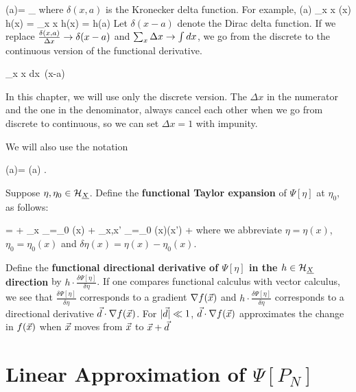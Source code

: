 \beq
\frac{\delta \Psi[\eta]}
{\delta \eta(a)}=
\lim_{\eps{}}
{\eps}
\eeq
where $\delta(x,a)$ is the Kronecker delta function.
For example,
\beq
\frac{\delta}
{\delta \eta(a)}
\sum_x \Delta x\; \eta(x) h(x)
=
\sum_x \Delta x  h(x)
=
h(a)
\eeq
 Let
$\delta(x-a)$ denote the Dirac delta function. If we replace
$\frac{\delta(x,a)}{\Delta x}\rightarrow\delta(x-a)$
and $\sum_x \Delta x\rightarrow \int dx$, we go
from the discrete to the continuous version
of the functional derivative.

\beq
\sum_x \Delta x 
\rarrow \int dx\, \delta(x-a)
\eeq

In this chapter, we will use only the discrete version.
The $\Delta x$ in the numerator
and the one in the denominator, always cancel
each other when we go from discrete
to continuous, so we can
set
$\Delta x=1$ with impunity.



We will also use the notation

\beq
\dpsi[\eta](a)=
\frac{\delta \Psi[\eta]}
{\delta \eta(a)}
\;.
\eeq

Suppose $\eta, \eta_0\in \calh_\rvX$. Define the
{\bf functional Taylor expansion} of $\Psi[\eta]$
at $\eta_0$, as follows:

\beq
\Psi[\eta]=
\Psi[\eta_0]
+ \sum_x
_{\eta=\eta_0}
\delta\eta(x)
+
\sum_{x,x'}
_{\eta=\eta_0}
\delta\eta(x)\delta\eta(x')
+
\cdots
\eeq
where we abbreviate
$ \eta =\eta(x)$,
$\eta_0=\eta_0(x)$ and $\delta \eta(x) = \eta(x)-\eta_0(x)$.



Define the
{\bf functional directional derivative of $\Psi[\eta]$ in
the $h\in \calh_\rvX$
direction}
by $h\cdot\frac{\delta \Psi[\eta]}{\delta \eta}$.
If one compares functional calculus with vector calculus, we see that
$\frac{\delta \Psi[\eta]}{\delta \eta}$ corresponds to a gradient
$\nabla f({\vec{x}})$ and
$h\cdot \frac{\delta \Psi[\eta]}{\delta \eta}$
corresponds to a directional derivative
${\vec{d}}\cdot \nabla f({\vec{x}})$.
For $|{\vec{d}}|\ll 1$, ${\vec{d}}\cdot \nabla f({\vec{x}})$ approximates
the change
in $f({\vec{x}})$ when ${\vec{x}}$ moves from ${\vec{x}}$ to ${\vec{x}}+{\vec{d}}$


\section{Linear Approximation of $\Psi[P_N]$}



